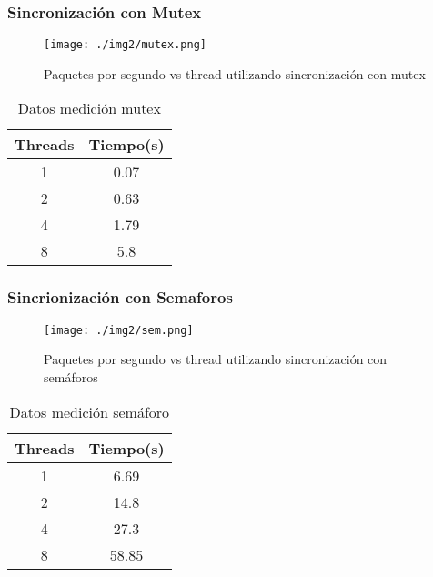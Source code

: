 \documentclass[12pt,spanish,letterpaper]{article}
\begin{document}
\subsubsection{Sincronización con Mutex}
\begin{multicols}{2}
	\begin{figure}[H]
		\centering
		\texttt{[image: ./img2/mutex.png]}
		\caption{Paquetes por segundo vs thread utilizando sincronización con mutex}
	\end{figure}
	\begin{table}[H]
		\centering
		\begin{tabular}{|c|c|}
		\hline
		Threads&Tiempo(s)\\
		\hline
		1&0.07\\
		2&0.63\\
		4&1.79\\
		8&5.8\\
		\hline
		\end{tabular}
		\caption{Datos medición mutex}
	\end{table}
\end{multicols}
\subsubsection{Sincrionización con Semaforos}
\begin{multicols}{2}
	\begin{figure}[H]
		\centering
		\texttt{[image: ./img2/sem.png]}
		\caption{Paquetes por segundo vs thread utilizando sincronización con semáforos}
	\end{figure}
	\begin{table}[H]
		\centering
		\begin{tabular}{|c|c|}
		\hline
		Threads&Tiempo(s)\\
		\hline
		1&6.69\\
		2&14.8\\
		4&27.3\\
		8&58.85\\
		\hline
		\end{tabular}
		\caption{Datos medición semáforo}
	\end{table}
\end{multicols}
\end{document}
